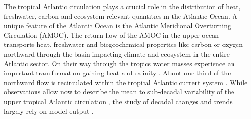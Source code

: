 \documentclass[os, manuscript]{copernicus}
\begin{document}


\introduction  %
The tropical Atlantic circulation plays a crucial role in the distribution of heat, freshwater, carbon and ecosystem relevant quantities in the Atlantic Ocean. A unique feature of the Atlantic Ocean is the Atlantic Meridional Overturning Circulation (AMOC). The return flow of the AMOC in the upper ocean transports heat, freshwater and biogeochemical properties like carbon or oxygen northward through the basin impacting climate and ecosystem in the entire Atlantic sector. On their way through the tropics water masses experience an important transformation gaining heat \citep[0.22 PW, ][]{Hazeleger2006} and salinity  \citep[freshwater divergence of 0.16Sv,][]{Hazeleger2006}. About one third of the northward flow is recirculated within the tropical Atlantic current system \citep{Hazeleger2006,Tuchen2022}. While observations allow now to describe the mean to sub-decadal variability of the upper tropical Atlantic circulation \cite[e.g.][]{Tuchen2022,Brandt2021a, Burmeister2020}, the study of decadal changes and trends largely rely on model output \cite[e.g.][]{Burmeister2019,Huettl2008,Duteil2014a}. 
\end{document}

